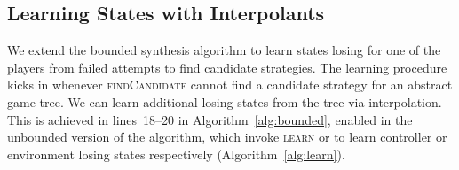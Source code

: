 



\subsection{Learning States with Interpolants}

We extend the bounded synthesis algorithm to learn states losing for one of the
players from failed attempts to find candidate strategies.  The learning
procedure kicks in whenever \textsc{findCandidate} cannot find a candidate
strategy for an abstract game tree. We can learn additional losing states from
the tree via interpolation.  This is achieved in lines~18--20 in
Algorithm~\ref{alg:bounded}, enabled in the unbounded version of the algorithm,
which invoke \textsc{learn} or \textsc{} to learn
controller or environment losing states respectively
(Algorithm~\ref{alg:learn}).


